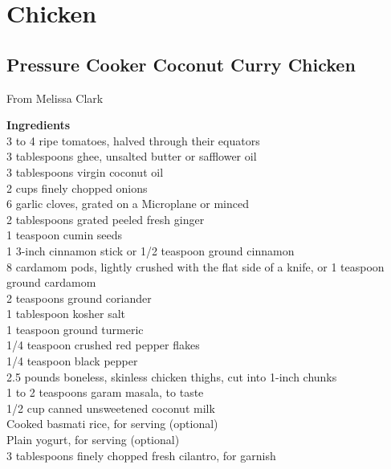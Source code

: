 \documentclass{article}
\numberwithin{figure}{section}
\numberwithin{equation}{section}
\begin{document}
\pagebreak
\section{Chicken}

\pagebreak
\subsection{Pressure Cooker Coconut Curry Chicken}
From Melissa Clark

{\bf Ingredients}\\
3 to 4  ripe tomatoes, halved through their equators\\
3  tablespoons ghee, unsalted butter or safflower oil\\
3  tablespoons virgin coconut oil\\
2  cups finely chopped onions\\
6  garlic cloves, grated on a Microplane or minced\\
2  tablespoons grated peeled fresh ginger\\
1  teaspoon cumin seeds\\
1  3-inch cinnamon stick or 1/2 teaspoon ground cinnamon\\
8  cardamom pods, lightly crushed with the flat side of a knife, or 1 teaspoon ground cardamom\\
2  teaspoons ground coriander\\
1  tablespoon kosher salt\\
1  teaspoon ground turmeric\\
1/4  teaspoon crushed red pepper flakes\\
1/4  teaspoon black pepper\\
2.5  pounds boneless, skinless chicken thighs, cut into 1-inch chunks\\
1 to 2  teaspoons garam masala, to taste\\
1/2  cup canned unsweetened coconut milk\\
 Cooked basmati rice, for serving (optional)\\
 Plain yogurt, for serving (optional)\\
3  tablespoons finely chopped fresh cilantro, for garnish\\
\end{document}
